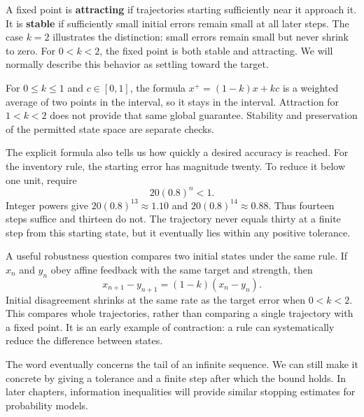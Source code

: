 \documentclass[11pt,oneside,openany]{book}
\theoremstyle{definition}
\theoremstyle{remark}
\numberwithin{equation}{chapter}
\begin{document}
A fixed point is \textbf{attracting} if trajectories starting sufficiently near it approach it. It is \textbf{stable} if sufficiently small initial errors remain small at all later steps. The case \(k=2\) illustrates the distinction: small errors remain small but never shrink to zero. For \(0<k<2\), the fixed point is both stable and attracting. We will normally describe this behavior as settling toward the target.

For \(0\leq k\leq1\) and \(c\in[0,1]\), the formula \(x^+=(1-k)x+kc\) is a weighted average of two points in the interval, so it stays in the interval. Attraction for \(1<k<2\) does not provide that same global guarantee. Stability and preservation of the permitted state space are separate checks.

The explicit formula also tells us how quickly a desired accuracy is reached. For the inventory rule, the starting error has magnitude twenty. To reduce it below one unit, require \[20(0.8)^n<1.\] Integer powers give \(20(0.8)^{13}\approx1.10\) and \(20(0.8)^{14}\approx0.88\). Thus fourteen steps suffice and thirteen do not. The trajectory never equals thirty at a finite step from this starting state, but it eventually lies within any positive tolerance.

A useful robustness question compares two initial states under the same rule. If \(x_n\) and \(y_n\) obey affine feedback with the same target and strength, then \[x_{n+1}-y_{n+1}=(1-k)(x_n-y_n).\] Initial disagreement shrinks at the same rate as the target error when \(0<k<2\). This compares whole trajectories, rather than comparing a single trajectory with a fixed point. It is an early example of contraction: a rule can systematically reduce the difference between states.

The word eventually concerns the tail of an infinite sequence. We can still make it concrete by giving a tolerance and a finite step after which the bound holds. In later chapters, information inequalities will provide similar stopping estimates for probability models.
\end{document}
